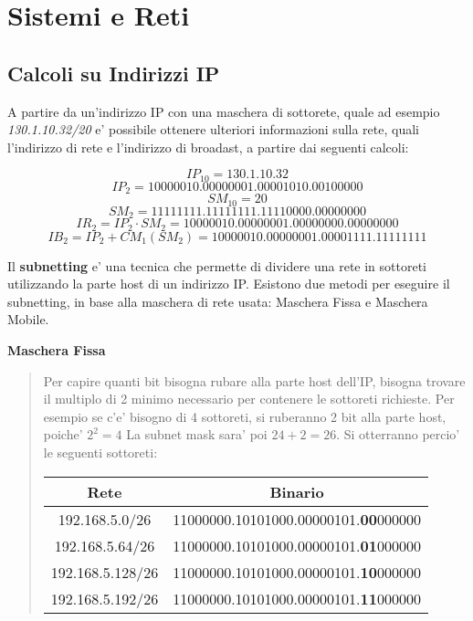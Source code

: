 \documentclass{article}
\begin{document}
  \section{Sistemi e Reti}
  {
    \subsection{Calcoli su Indirizzi IP}
    A partire da un'indirizzo IP con una maschera di sottorete, quale ad esempio \textit{130.1.10.32/20} e' possibile ottenere ulteriori informazioni sulla rete, quali l'indirizzo di rete e l'indirizzo di broadast, a partire dai seguenti calcoli:

    $$ IP_{10} = 130.1.10.32 $$ 
    $$ IP_{2} = 10000010.00000001.00001010.00100000 $$
    $$ SM_{10} = 20 $$
    $$ SM_{2} = 11111111.11111111.11110000.00000000 $$
    $$ IR_{2} = IP_{2} \cdot SM_{2} = 10000010.00000001.00000000.00000000 $$
    $$ IB_{2} = IP_{2} + CM_{1}(SM_{2}) = 10000010.00000001.00001111.11111111 $$

    Il \textbf{subnetting} e' una tecnica che permette di dividere una rete in sottoreti utilizzando la parte host di un indirizzo IP. Esistono due metodi per eseguire il subnetting, in base alla maschera di rete usata: Maschera Fissa e Maschera Mobile.

    \textbf{Maschera Fissa}
    \begin{quote}
      Per capire quanti bit bisogna rubare alla parte host dell'IP, bisogna trovare il multiplo di 2 minimo necessario per contenere le sottoreti richieste. Per esempio se c'e' bisogno di 4 sottoreti, si ruberanno 2 bit alla parte host, poiche' $ 2^2 = 4 $ La subnet mask sara' poi $ 24 + 2 = 26 $. Si otterranno percio' le seguenti sottoreti:

      \begin{tabular}{ |c|c| }
        \hline
        Rete & Binario \\
        \hline
        192.168.5.0/26 & 11000000.10101000.00000101.\textbf{00}000000 \\
        192.168.5.64/26 & 11000000.10101000.00000101.\textbf{01}000000 \\
        192.168.5.128/26 & 11000000.10101000.00000101.\textbf{10}000000 \\
        192.168.5.192/26 & 11000000.10101000.00000101.\textbf{11}000000 \\
        \hline
      \end{tabular}
    \end{quote}

}
\end{document}
